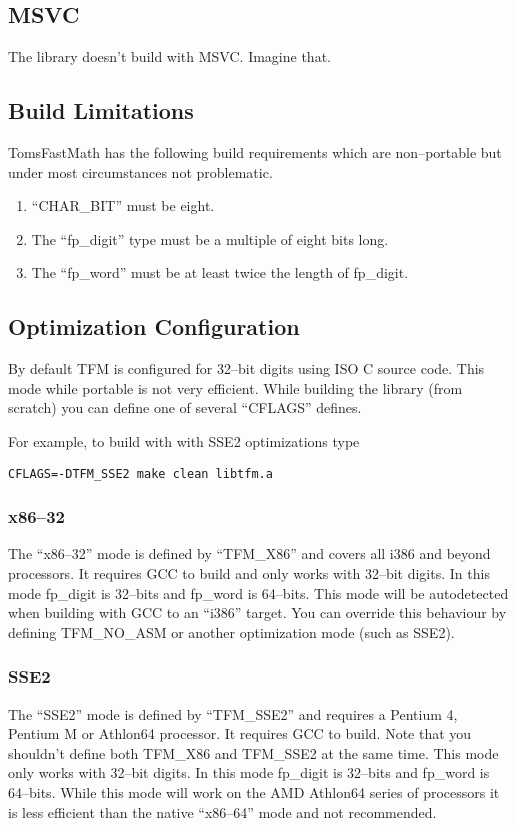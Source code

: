\documentclass[b5paper]{book}
\begin{document}
\subsection{MSVC}
The library doesn't build with MSVC.  Imagine that.

\subsection{Build Limitations}
TomsFastMath has the following build requirements which are non--portable but under most 
circumstances not problematic.

\begin{enumerate}
\item ``CHAR\_BIT'' must be eight.  
\item The ``fp\_digit'' type must be a multiple of eight bits long.
\item The ``fp\_word'' must be at least twice the length of fp\_digit.
\end{enumerate}

\subsection{Optimization Configuration}
By default TFM is configured for 32--bit digits using ISO C source code.  This mode while portable
is not very efficient.  While building the library (from scratch) you can define one of 
several ``CFLAGS'' defines.

For example, to build with with SSE2 optimizations type 

\begin{verbatim}
CFLAGS=-DTFM_SSE2 make clean libtfm.a
\end{verbatim}

\subsubsection{x86--32}  The ``x86--32'' mode is defined by ``TFM\_X86'' and covers all
i386 and beyond processors.  It requires GCC to build and only works with 32--bit digits.  In this 
mode fp\_digit is 32--bits and fp\_word is 64--bits.  This mode will be autodetected when building 
with GCC to an  ``i386'' target.  You can override this behaviour by defining TFM\_NO\_ASM or 
another optimization mode (such as SSE2).

\subsubsection{SSE2} The ``SSE2'' mode is defined by ``TFM\_SSE2'' and requires a Pentium 4, Pentium
M or Athlon64 processor.  It requires GCC to build.  Note that you shouldn't define both
TFM\_X86 and TFM\_SSE2 at the same time.   This mode only works with 32--bit digits.  In this 
mode fp\_digit is 32--bits and fp\_word is 64--bits.  While this mode will work on the AMD Athlon64 
series of processors it is less efficient than the native ``x86--64'' mode and not recommended.
\end{document}
